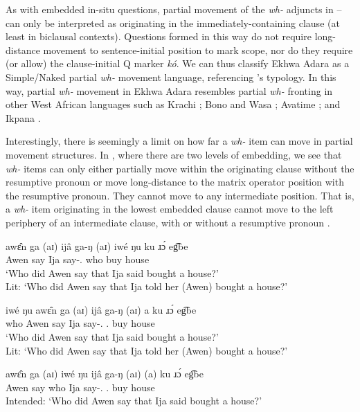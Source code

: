 \documentclass[output=paper,colorlinks,citecolor=brown
]{langscibook}
\begin{document}
\noindent As with embedded in-situ questions, partial movement of the \textit{wh-} adjuncts in – can only be interpreted as originating in the immediately-containing clause (at least in biclausal contexts). Questions formed in this way do not require long-distance movement to sentence-initial position to mark scope, nor do they require (or allow) the clause-initial Q marker \textit{kó}. We can thus classify Ekhwa Adara as a Simple/Naked partial \textit{wh-} movement language, referencing \cite{Fanselow2006}'s typology. In this way, partial \textit{wh-} movement in Ekhwa Adara resembles partial \textit{wh-} fronting in other West African languages such as Krachi \citep{TorrenceKandybowicz2013, TorrenceKandybowicz2015, KandybowiczTorrence2015}; Bono and Wasa \citep{Kandybowicz2017, Kandybowicz2020, KandybowiczTorrence2015}; Avatime \citep{DevlinTorrence2021}; and Ikpana \citep{KandybowiczKatsuda2021, KandybowiczKatsuda2023}. 

Interestingly, there is seemingly a limit on how far a \textit{wh-} item can move in partial movement structures. In , where there are two levels of embedding, we see that \textit{wh-} items can only either partially move within the originating clause  without the resumptive pronoun or move long-distance to the matrix operator position  with the resumptive pronoun. They cannot move to any intermediate position. That is, a \textit{wh-} item originating in the lowest embedded clause cannot move to the left periphery of an intermediate clause, with or without a resumptive pronoun .

\ea \label{ex:matte:new20}

\begin{xlist}

\ex \label{ex:matte:new20a}
\gll awɛ̂n ga (aɪ) ijâ ga-ŋ (aɪ)	iwé ŋu {\longrule} ku ɹɔ́ eg͡be\\
Awen say \Comp{} Ija say-\Tsg{}.\Acc{} \Comp{} who \Foc{} {} \Pfv{} buy house\\
\glt `Who did Awen say that Ija said bought a house?'\\
Lit: `Who did Awen say that Ija told her (Awen) bought a house?'


\ex \label{ex:matte:new20b}
\gll iwé ŋu awɛ̂n ga (aɪ) ijâ ga-ŋ (aɪ) a ku ɹɔ́ eg͡be\\
who \Foc{} Awen say \Comp{} Ija say-\Tsg{}.\Acc{} \Comp{} \Tsg{}.\Nom{} \Pfv{} buy house\\
\glt `Who did Awen say that Ija said bought a house?'\\
Lit: `Who did Awen say that Ija told her (Awen) bought a house?'

\ex \label{ex:matte:new20c}
\gll *awɛ̂n ga (aɪ) iwé ŋu ijâ ga-ŋ (aɪ) (a) ku ɹɔ́ eg͡be\\
Awen say \Comp{} who \Foc{} Ija say-\Tsg{}.\Acc{} \Comp{} \Tsg{}.\Nom{} \Pfv{} buy house\\
\glt Intended: `Who did Awen say that Ija said bought a house?'

\end{xlist}
\z
\end{document}
